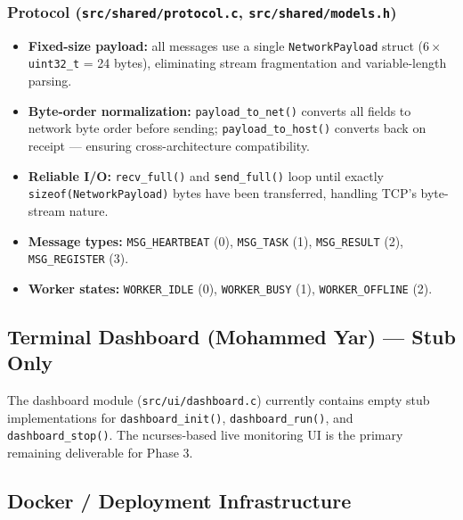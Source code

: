 \documentclass[12pt,a4paper]{article}
\begin{document}
\subsubsection{Protocol (\texttt{src/shared/protocol.c}, \texttt{src/shared/models.h})}
\begin{itemize}[noitemsep]
    \item \textbf{Fixed-size payload:} all messages use a single \texttt{NetworkPayload} struct (6\,$\times$\,\texttt{uint32\_t} = 24 bytes), eliminating stream fragmentation and variable-length parsing.
    \item \textbf{Byte-order normalization:} \texttt{payload\_to\_net()} converts all fields to network byte order before sending; \texttt{payload\_to\_host()} converts back on receipt --- ensuring cross-architecture compatibility.
    \item \textbf{Reliable I/O:} \texttt{recv\_full()} and \texttt{send\_full()} loop until exactly \texttt{sizeof(NetworkPayload)} bytes have been transferred, handling TCP's byte-stream nature.
    \item \textbf{Message types:} \texttt{MSG\_HEARTBEAT} (0), \texttt{MSG\_TASK} (1), \texttt{MSG\_RESULT} (2), \texttt{MSG\_REGISTER} (3).
    \item \textbf{Worker states:} \texttt{WORKER\_IDLE} (0), \texttt{WORKER\_BUSY} (1), \texttt{WORKER\_OFFLINE} (2).
\end{itemize}

\subsection{Terminal Dashboard (Mohammed Yar) --- Stub Only}

The dashboard module (\texttt{src/ui/dashboard.c}) currently contains empty stub implementations
for \texttt{dashboard\_init()}, \texttt{dashboard\_run()}, and \texttt{dashboard\_stop()}.
The ncurses-based live monitoring UI is the primary remaining deliverable for Phase 3.

\subsection{Docker / Deployment Infrastructure}
\end{document}
